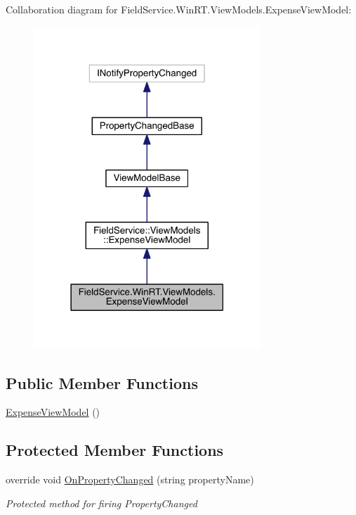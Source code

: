 Collaboration diagram for Field\+Service.\+Win\+R\+T.\+View\+Models.\+Expense\+View\+Model\+:
\nopagebreak
\begin{figure}[H]
\begin{center}
\leavevmode
\includegraphics[width=242pt]{class_field_service_1_1_win_r_t_1_1_view_models_1_1_expense_view_model__coll__graph}
\end{center}
\end{figure}
\subsection*{Public Member Functions}
\begin{DoxyCompactItemize}
\item 
\hyperlink{class_field_service_1_1_win_r_t_1_1_view_models_1_1_expense_view_model_ab29a523322238fbe68a4be2a60103a48}{Expense\+View\+Model} ()
\end{DoxyCompactItemize}
\subsection*{Protected Member Functions}
\begin{DoxyCompactItemize}
\item 
override void \hyperlink{class_field_service_1_1_win_r_t_1_1_view_models_1_1_expense_view_model_a6bf375b7117515d88f91a24d40917db1}{On\+Property\+Changed} (string property\+Name)
\begin{DoxyCompactList}\small\item\em Protected method for firing Property\+Changed \end{DoxyCompactList}\end{DoxyCompactItemize}
